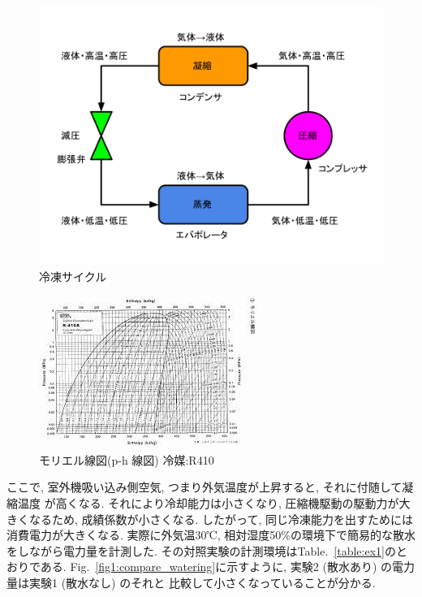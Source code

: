 \documentclass[a4j,fleqn,dvipdfmx,uplatex]{jsarticle}
\newcommand{\figref}[1]{Fig.\ \ref{#1}}
\newcommand{\tableref}[1]{Table.\ \ref{#1}}
\begin{document}
\begin{figure}[htb]
  \centering
      \includegraphics[width=0.8\linewidth]{img/cycle-2.png}
      \caption{冷凍サイクル}
      \label{fig1:cycle}
\end{figure}

\begin{figure}[htb]
    \centering
        \includegraphics[width=\linewidth]{img/ph線図.jpg}
        \caption{モリエル線図(p-h 線図) 冷媒:R410}
        \label{fig1:ph_r410}
\end{figure}

ここで, 室外機吸い込み側空気, つまり外気温度が上昇すると, それに付随して凝縮温度
が高くなる. それにより冷却能力は小さくなり, 圧縮機駆動の駆動力が大きくなるため, 
成績係数が小さくなる. したがって, 同じ冷凍能力を出すためには消費電力が大きくなる.  
実際に外気温30℃, 相対湿度50\%の環境下で簡易的な散水をしながら電力量を計測した. 
その対照実験の計測環境は\tableref{table:ex1}のとおりである. 
\figref{fig1:compare_watering}に示すように, 実験2 (散水あり) の電力量は実験1 (散水なし) のそれと
比較して小さくなっていることが分かる.
\end{document}
